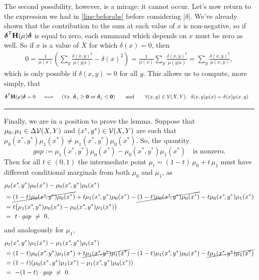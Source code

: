 \begin{subappendices}
\begin{lproof}
    The second possibility, however, is a mirage: it cannot occur.
    Let's now return to the expression we had in \eqref{line:beforabs} before considering $|\delta|$.
    We've already shown that the contribution to the sum at each value of $x$ is non-negative, so if ${\boldsymbol\delta}^{\sf T} \mathbf H(\mu) {\boldsymbol\delta}$ is equal to zero, each summand which depends on $x$ must be zero as well.
    So if $x$ is a value of $X$ for which $\delta(x) = 0$, then
    \begin{align*}
        0 = \frac{1}{\mu(x)} \left( \sum_y \frac{\delta(x,y)^2}{\mu(y|x)} - \delta(x)^2 \right)
         = \frac{1}{\mu(x)} \sum_y \frac{\delta(x,y)^2}{\mu(y|x)}
         = \sum_y \frac{\delta(x,y)^2}{\mu(x,y)},
    \end{align*}
    which is only possible if $\delta(x,y) = 0$ for all $y$.
    This allows us to compute, more simply, that
    \begin{align*}
        {\boldsymbol\delta}^{\sf T} \mathbf H(\mu) {\boldsymbol\delta} = 0
        \quad&\iff\quad
            (\forall x .~  {\boldsymbol\delta}_x \ge \mathbf 0 \text{ or } {\boldsymbol\delta}_x \le \mathbf 0)
            \qquad\text{and}\qquad
            \forall (x,y) \in \mathcal V(X,Y).~~
                \delta(x,y) \mu(x) = \delta(x) \mu(x,y)
        \end{align*}

    \medskip
    \hrule
    \medskip

    Finally, we are in a position to prove the lemma.
    Suppose that $\mu_0,\mu_1 \in \Delta\mathcal V(X,Y)$ and $(x^*,y^*) \in \mathcal V(X,Y)$
    are such that $\mu_0(x^*,y^*) \mu_1(x^*)  \ne \mu_1(x^*,y^*) \mu_0(x^*)$.
    So, the quantity
    \[
        \mathit{gap} := \mu_1(x^*,y^*) \mu_0(x^*) - \mu_0(x^*,y^*) \mu_1(x^*)
        \quad\text{is nonzero}.
    \]
    Then for all $t \in (0,1)$ the intermediate point $\mu_t = (1-t)\, \mu_0 + t\, \mu_1$ must have different conditional marginals from both $\mu_0$ and $\mu_1$, as
    \begin{align*}
        &\mu_t(x^*\!,y^*)\mu_0(x^*) - \mu_0(x^*\!,y^*) \mu_t(x^*) \\
            &= \Cancel{(1-t)\mu_0(x^*\!,y^*)\mu_0(x^*)} + t \mu_1(x^*\!,y^*)\mu_0(x^*)
                -  \Cancel{(1-t)\mu_0(x^*\!,y^*) \mu_0(x^*)} - t\mu_0(x^*\!,y^*) \mu_1(x^*) \\
            &= t \pqty[\big] { \mu_1(x^*\!,y^*)\mu_0(x^*) -\mu_0(x^*\!,y^*) \mu_1(x^*)}
            \\
            &=~ t \cdot \mathit{gap}
            ~\ne~ 0,
    \end{align*}
    and analogously for $\mu_1$,
    \begin{align*}
        &\mu_t(x^*\!,y^*)\mu_1(x^*) - \mu_1(x^*\!,y^*) \mu_t(x^*) \\
            &= (1-t)\mu_0(x^*\!,y^*)\mu_1(x^*) + {\color{black}\cancel{\color{black} t \mu_1(x^*\!,y^*)\mu_1(x^*) }}
                -  (1-t)\mu_1(x^*\!,y^*) \mu_0(x^*) - {\color{black}\cancel{\color{black} t\mu_1(x^*\!,y^*) \mu_1(x^*) }} \\
            &= (1-t) (\mu_0(x^*,y^*)\mu_1(x^*) -\mu_1(x^*\!,y^*) \mu_0(x^*))
            \\
            &=~ -(1-t) \cdot \mathit{gap}
            ~\ne~ 0.
    \end{align*}


\end{lproof}
\end{subappendices}
